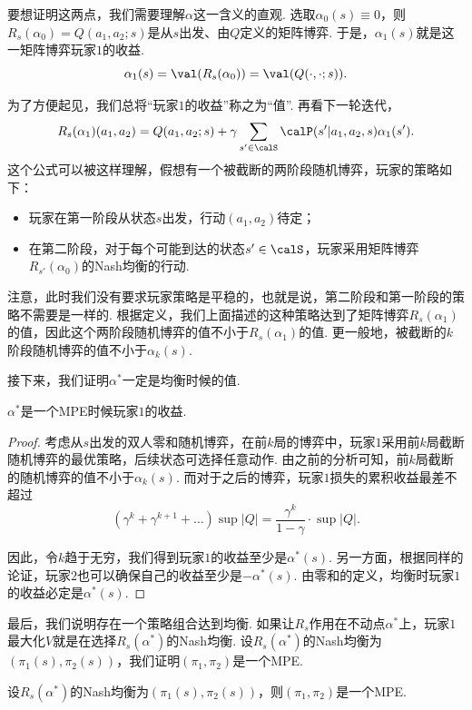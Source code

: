 要想证明这两点，我们需要理解$\alpha$这一含义的直观. 选取$\alpha_0(s)\equiv 0$，则$R_s(\alpha_0)=Q(a_1,a_2;s)$是从$s$出发、由$Q$定义的矩阵博弈. 于是，$\alpha_1(s)$就是这一矩阵博弈玩家$1$的收益. 
    \[\alpha_1(s)=\val(R_s(\alpha_0))=\val(Q(\cdot,\cdot;s)).\]

为了方便起见，我们总将“玩家$1$的收益”称之为“值”. 再看下一轮迭代，
\[R_s(\alpha_1)(a_1,a_2)=Q(a_1,a_2;s)+\gamma\sum_{s'\in \calS}\calP(s'|a_1,a_2,s)\alpha_1(s').\]
这个公式可以被这样理解，假想有一个被截断的两阶段随机博弈，玩家的策略如下：
    \begin{itemize}
        \item 玩家在第一阶段从状态$s$出发，行动$(a_1,a_2)$待定；
        \item 在第二阶段，对于每个可能到达的状态$s'\in \calS$，玩家采用矩阵博弈$R_{s'}(\alpha_0)$的Nash均衡的行动.
    \end{itemize}

注意，此时我们没有要求玩家策略是平稳的，也就是说，第二阶段和第一阶段的策略不需要是一样的. 根据定义，我们上面描述的这种策略达到了矩阵博弈$R_s(\alpha_1)$的值，因此这个两阶段随机博弈的值不小于$R_s(\alpha_1)$的值. 更一般地，被截断的$k$阶段随机博弈的值不小于$\alpha_{k}(s)$. 

接下来，我们证明$\alpha^*$一定是均衡时候的值. 

\begin{lemma}
    $\alpha^*$是一个MPE时候玩家$1$的收益. 
\end{lemma}
\begin{proof}
考虑从$s$出发的双人零和随机博弈，在前$k$局的博弈中，玩家$1$采用前$k$局截断随机博弈的最优策略，后续状态可选择任意动作. 由之前的分析可知，前$k$局截断的随机博弈的值不小于$\alpha_k(s)$. 而对于之后的博弈，玩家$1$损失的累积收益最差不超过
\[(\gamma^k+\gamma^{k+1}+\dots)\sup|Q|=\frac{\gamma^k}{1-\gamma}\cdot \sup|Q|.\]

因此，令$k$趋于无穷，我们得到玩家$1$的收益至少是$\alpha^*(s)$. 另一方面，根据同样的论证，玩家$2$也可以确保自己的收益至少是$-\alpha^*(s)$. 由零和的定义，均衡时玩家$1$的收益必定是$\alpha^*(s)$. 
\end{proof}

最后，我们说明存在一个策略组合达到均衡. 如果让$R_s$作用在不动点$\alpha^*$上，玩家$1$最大化$V$就是在选择$R_s(\alpha^*)$的Nash均衡. 设$R_s(\alpha^*)$的Nash均衡为$(\pi_1(s),\pi_2(s))$，我们证明$(\pi_1,\pi_2)$是一个MPE. 

\begin{lemma}
    设$R_s(\alpha^*)$的Nash均衡为$(\pi_1(s),\pi_2(s))$，则$(\pi_1,\pi_2)$是一个MPE.
\end{lemma}


